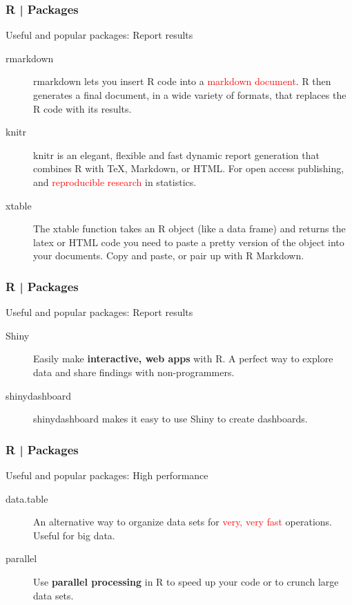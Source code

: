 \begin{frame}
  \frametitle{R | Packages}
  \begin{block}{Useful and popular packages: Report results}
    \begin{description}
      \item[\alert{rmarkdown}] rmarkdown lets you insert R code into a \textcolor{red}{markdown document}. R then generates a final document, in a wide variety of formats, that replaces the R code with its results.
      \item[\alert{knitr}] knitr is an elegant, flexible and fast dynamic report generation that combines R with TeX, Markdown, or HTML. For open access publishing, and \textcolor{red}{reproducible research} in statistics.
      \item[\alert{xtable}] The xtable function takes an R object (like a data frame) and returns the latex or HTML code you need to paste a pretty version of the object into your documents. Copy and paste, or pair up with R Markdown.
    \end{description}
  \end{block}
\end{frame}

\begin{frame}
  \frametitle{R | Packages}
  \begin{block}{Useful and popular packages: Report results}
    \begin{description}
      \item[Shiny] Easily make \textbf{interactive, web apps} with R. A perfect way to explore data and share findings with non-programmers.
      \item[shinydashboard] shinydashboard makes it easy to use Shiny to create dashboards.
    \end{description}
  \end{block}
\end{frame}

\begin{frame}
  \frametitle{R | Packages}
  \begin{block}{Useful and popular packages: High performance}
    \begin{description}
      \item[\alert{data.table}] An alternative way to organize data sets for \textcolor{red}{very, very fast} operations. Useful for big data.
      \item[parallel] Use \textbf{parallel processing} in R to speed up your code or to crunch large data sets.
    \end{description}
  \end{block}
\end{frame}

